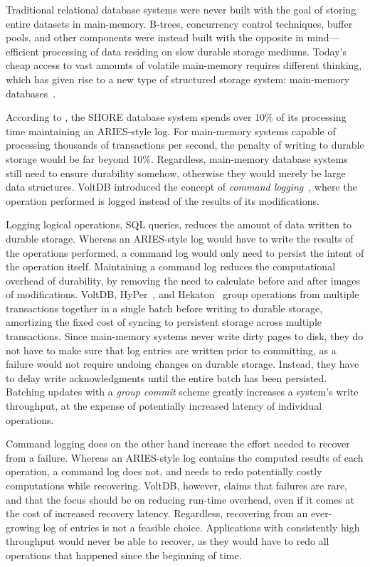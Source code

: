 Traditional relational database systems were never built with the goal of
storing entire datasets in main-memory. B-trees, concurrency control techniques,
buffer pools, and other components were instead built with the opposite in
mind---efficient processing of data residing on slow durable storage mediums.
Today's cheap access to vast amounts of volatile main-memory requires different
thinking, which has given rise to a new type of structured storage system:
main-memory databases~\cite{main-memory}.

According to \cite{oltp}, the SHORE
database system spends over 10\% of its processing time maintaining an
ARIES-style log. For main-memory systems capable of processing thousands of
transactions per second, the penalty of writing to durable storage would be far
beyond 10\%. Regardless, main-memory database systems still need to ensure
durability somehow, otherwise they would merely be large data structures. VoltDB
introduced the concept of \textit{command logging}~\cite{voltdb-recovery}, where
the operation performed is logged instead of the results of its modifications.

Logging logical operations, \eg SQL queries, reduces the amount of data written
to durable storage. Whereas an ARIES-style log would have to write the results
of the operations performed, a command log would only need to persist the intent
of the operation itself. Maintaining a command log reduces the computational
overhead of durability, by removing the need to calculate before and after
images of modifications. VoltDB, HyPer~\cite{hyper}, and Hekaton~\cite{hekaton}
group operations from multiple transactions together in a single batch before
writing to durable storage, amortizing the fixed cost of syncing to persistent
storage across multiple transactions. Since main-memory systems never write
dirty pages to disk, they do not have to make sure that log entries are written
prior to committing, as a failure would not require undoing changes on durable
storage. Instead, they have to delay write acknowledgments until the entire
batch has been persisted. Batching updates with a \textit{group commit} scheme
greatly increases a system's write throughput, at the expense of potentially
increased latency of individual operations.

Command logging does on the other hand increase the effort needed to recover
from a failure. Whereas an ARIES-style log contains the computed results of each
operation, a command log does not, and needs to redo potentially costly
computations while recovering. VoltDB, however, claims that failures are rare,
and that the focus should be on reducing run-time overhead, even if it comes at
the cost of increased recovery latency. Regardless, recovering from an
ever-growing log of entries is not a feasible choice. Applications with
consistently high throughput would never be able to recover, as they would have
to redo all operations that happened since the beginning of time.

